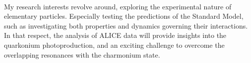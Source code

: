 \documentclass[a4paper]{article}
\begin{document}
~\par My research interests revolve around, exploring the experimental nature of elementary particles. Especially testing the predictions of the Standard Model, such as investigating both properties and dynamics governing their interactions. In that respect, the analysis of ALICE data will provide insights into the quarkonium photoproduction, and an exciting challenge to overcome the overlapping resonances with the charmonium state.  

\end{document}
